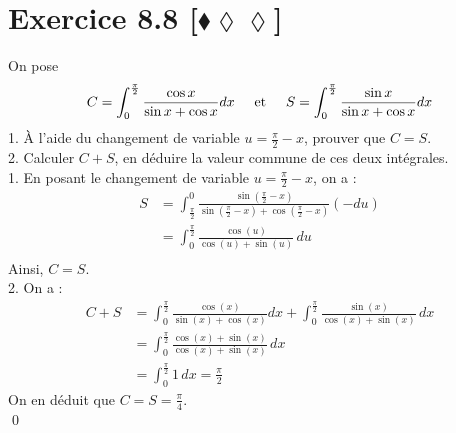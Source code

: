 \documentclass[10pt]{article}
\begin{document}
\section*{Exercice 8.8 [$\blacklozenge\lozenge\lozenge$]}
\begin{tcolorbox}[enhanced, width=7in, center, size=fbox, fontupper=\large, drop shadow southwest]
    On pose
    \begin{equation*}
        C=\int_0^{\frac{\pi}{2}}{\frac{\cos x}{\sin x + \cos x}dx} \hspace{0.5cm} \text{et} \hspace{0.5cm} S=\int_0^{\frac{\pi}{2}}{\frac{\sin x}{\sin x + \cos x}dx}
    \end{equation*}
    1. À l'aide du changement de variable $u=\frac{\pi}{2}-x$, prouver que $C=S$.\\
    2. Calculer $C + S$, en déduire la valeur commune de ces deux intégrales.\\[0.5cm]
    1. En posant le changement de variable $u = \frac{\pi}{2} - x$, on a :
    \begin{align*}
    S &= \int_{\frac{\pi}{2}}^{0} \frac{\sin\left(\frac{\pi}{2} - x\right)}{\sin\left(\frac{\pi}{2} - x\right) + \cos\left(\frac{\pi}{2} - x\right)} (-du) \\
    &= \int_{0}^{\frac{\pi}{2}} \frac{\cos(u)}{\cos(u) + \sin(u)} \, du\\
    \end{align*}
    Ainsi, $C = S$.\\[0.25cm]
    2. On a :
    \begin{align*}
        C + S &= \int_{0}^{\frac{\pi}{2}} \frac{\cos(x)}{\sin(x) + \cos(x)}dx + \int_{0}^{\frac{\pi}{2}} \frac{\sin(x)}{\cos(x) + \sin(x)} \, dx\\
        &= \int_{0}^{\frac{\pi}{2}} \frac{\cos(x) + \sin(x)}{\cos(x) + \sin(x)} \,dx\\
        &= \int_{0}^{\frac{\pi}{2}} 1 \, dx = \frac{\pi}{2}
    \end{align*}
    On en déduit que $C = S = \frac{\pi}{4}$.\\
    \qed
\end{tcolorbox}

\end{document}
